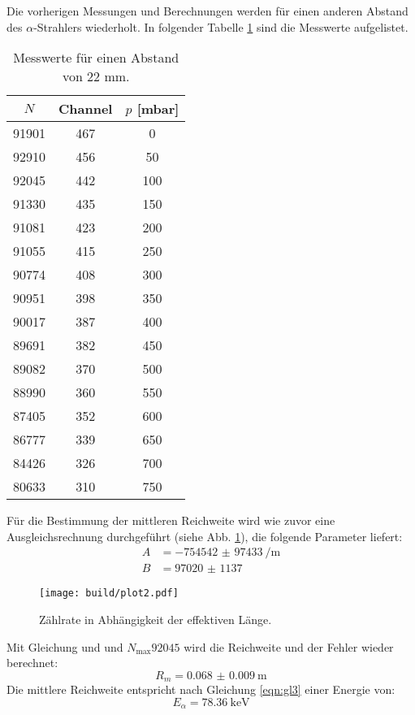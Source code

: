 Die vorherigen Messungen und Berechnungen werden für einen anderen Abstand des $\alpha$-Strahlers wiederholt.
In folgender Tabelle \ref{tab:M2} sind die Messwerte aufgelistet.
\begin{table}
  \centering
  \caption{Messwerte für einen Abstand von 22 mm.}
  \label{tab:M2}
  \begin{tabular}{c c c}
    \toprule
    $N$ & Channel & $p$ [mbar] \\
    \midrule
    91901 & 467 &   0 \\
    92910 & 456 &  50 \\
    92045 & 442 & 100 \\
    91330 & 435 & 150 \\
    91081 & 423 & 200 \\
    91055 & 415 & 250 \\
    90774 & 408 & 300 \\
    90951 & 398 & 350 \\
    90017 & 387 & 400 \\
    89691 & 382 & 450 \\
    89082 & 370 & 500 \\
    88990 & 360 & 550 \\
    87405 & 352 & 600 \\
    86777 & 339 & 650 \\
    84426 & 326 & 700 \\
    80633 & 310 & 750 \\
    \bottomrule
  \end{tabular}
\end{table}
Für die Bestimmung der mittleren Reichweite wird wie zuvor eine Ausgleichsrechnung durchgeführt (siehe Abb. \ref{fig:plot3}),
die folgende Parameter liefert:
\begin{align*}
  A &= \SI{-754542(97433)}{\per\meter} \\
  B &= \num{97020(1137)}
\end{align*}
\begin{figure}
  \centering
  \texttt{[image: build/plot2.pdf]}
  \caption{Zählrate in Abhängigkeit der effektiven Länge.}
  \label{fig:plot3}
\end{figure}
Mit Gleichung \label{eqn:r1} und \label{eqn:r1} und $N_\text{max} 92045$ wird die Reichweite und der Fehler wieder berechnet:
\begin{equation*}
  R_m = \SI{0.068(9)}{\meter}
\end{equation*}
Die mittlere Reichweite entspricht nach Gleichung \eqref{eqn:gl3} einer Energie von:
\begin{equation*}
  E_\alpha = \SI{78.36}{\kilo\eV}
\end{equation*}

